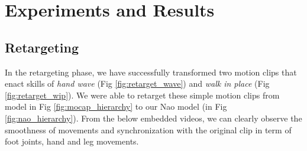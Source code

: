 \chapter{Experiments and Results}

\section{Retargeting}
In the retargeting phase,  we have successfully transformed two motion clips that enact skills of \textit{hand wave} (Fig \ref{fig:retarget_wave}) and \textit{walk in place} (Fig \ref{fig:retarget_wip}). We were able to retarget these simple motion clips from model in Fig \ref{fig:mocap_hierarchy} to our Nao model (in Fig \ref{fig:nao_hierarchy}). From the below embedded videos, we can clearly observe the smoothness of movements and synchronization with the original clip in term of foot joints, hand and leg movements. 

